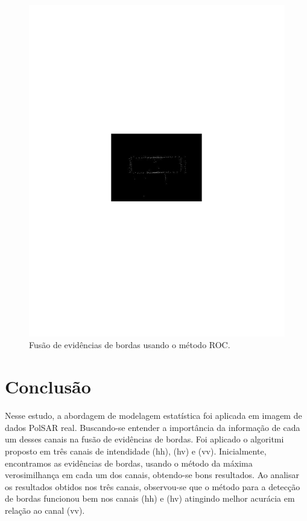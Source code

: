 \documentclass[conference]{IEEEtran}
\begin{document}
\begin{figure}[hbt]
	\includegraphics[scale=0.5]{flevoland_fusao_swt_crop.pdf}
	\caption{Fusão de evidências de bordas usando o método ROC.}
\label{fig_08}
\end{figure}

\section{Conclusão}\label{sec_08}
Nesse estudo, a abordagem de modelagem estatística foi aplicada em imagem de dados PolSAR real. Buscando-se entender a importância da informação de cada um desses canais na fusão de evidências de bordas. Foi aplicado o algoritmi proposto em três canais de intendidade (hh), (hv) e (vv). Inicialmente, encontramos as evidências de bordas, usando o método da máxima verosimilhança em cada um dos canais, obtendo-se bons resultados. Ao analisar os resultados obtidos nos três canais, observou-se que o método para a detecção de bordas funcionou bem nos canais (hh) e (hv) atingindo melhor acurácia em relação ao canal (vv).
\end{document}
